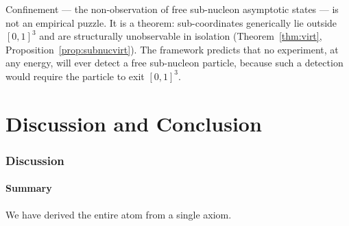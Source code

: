\documentclass[11pt,a4paper]{article}
\theoremstyle{definition}
\theoremstyle{remark}
\begin{document}
Confinement --- the non-observation of free sub-nucleon asymptotic states --- is not an empirical puzzle. It is a theorem: sub-coordinates generically lie outside $[0,1]^3$ and are structurally unobservable in isolation (Theorem~\ref{thm:virt}, Proposition~\ref{prop:subnucvirt}). The framework predicts that no experiment, at any energy, will ever detect a free sub-nucleon particle, because such a detection would require the particle to exit $[0,1]^3$.

\part{Discussion and Conclusion}

\section{Discussion}
\label{sec:disc}

\subsection{Summary}

We have derived the entire atom from a single axiom.
\end{document}
